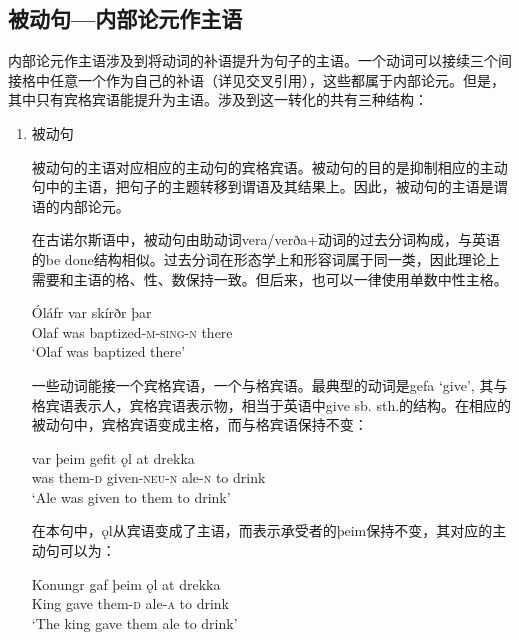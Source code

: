 \subsection{被动句—内部论元作主语}
\label{sec:passive}
内部论元作主语涉及到将动词的补语提升为句子的主语。一个动词可以接续三个间接格中任意一个作为自己的补语（详见交叉引用），这些都属于内部论元。但是，其中只有宾格宾语能提升为主语。涉及到这一转化的共有三种结构：
\begin{enumerate}
    \setlength{\parindent}{2em}
    \item 被动句

          被动句的主语对应相应的主动句的宾格宾语。被动句的目的是抑制相应的主动句中的主语，把句子的主题转移到谓语及其结果上。因此，被动句的主语是谓语的内部论元。

          在古诺尔斯语中，被动句由助动词vera/verða+动词的过去分词构成，与英语的be done结构相似。过去分词在形态学上和形容词属于同一类，因此理论上需要和主语的格、性、数保持一致。但后来，也可以一律使用单数中性主格。
          \begin{exe}
              \ex
              \gll Óláfr	var	skírðr	þar\\
              Olaf	was	baptized-\textsc{\MakeLowercase{M-SING-N }}	there\\
              \trans `Olaf was baptized there’
          \end{exe}

          一些动词能接一个宾格宾语，一个与格宾语。最典型的动词是gefa `give’, 其与格宾语表示人，宾格宾语表示物，相当于英语中give sb. sth.的结构。在相应的被动句中，宾格宾语变成主格，而与格宾语保持不变：
          \begin{exe}
              \ex
              \gll var	þeim	gefit	ǫl	at	drekka\\
              was	them-\textsc{d}	given-\textsc{\MakeLowercase{NEU-N}}	ale-\textsc{n}	to	drink\\
              \trans `Ale was given to them to drink’
          \end{exe}

          在本句中，ǫl从宾语变成了主语，而表示承受者的þeim保持不变，其对应的主动句可以为：
          \begin{exe}
              \ex
              \gll Konungr	gaf	þeim	ǫl	at	drekka\\
              King	gave	them-\textsc{d}	ale-\textsc{a}	to	drink\\
              \trans `The king gave them ale to drink’
          \end{exe}


\end{enumerate}
